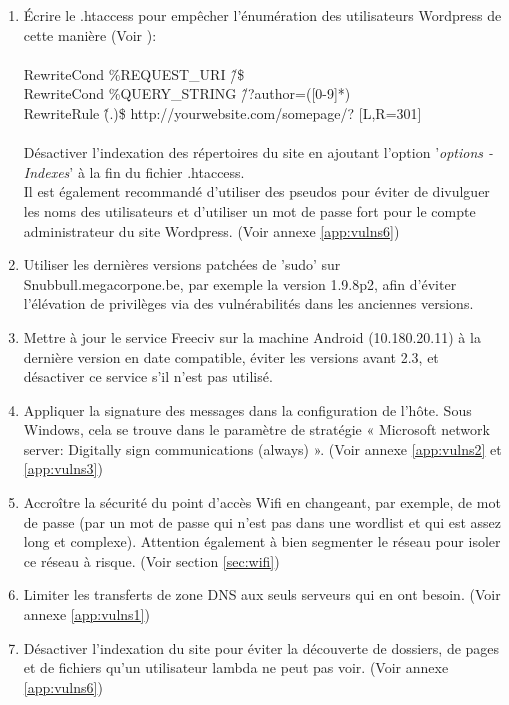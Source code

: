 \documentclass[a4paper]{article}
\begin{document}
\begin{enumerate}
    \item Écrire le .htaccess pour empêcher l'énumération des utilisateurs Wordpress de cette manière (Voir \cite{3}):\\ \\
    RewriteCond \%{REQUEST\_URI}  \^/\$\\
    RewriteCond \%{QUERY\_STRING} \^/?author=([0-9]*)\\
    RewriteRule \^(.\*)\$ http://yourwebsite.com/somepage/? [L,R=301]\\\\
    Désactiver l'indexation des répertoires du site en ajoutant l'option '\emph{options -Indexes}' à la fin du fichier .htaccess.\\
    Il est également recommandé d'utiliser des pseudos pour éviter de divulguer les noms des utilisateurs et d'utiliser un mot de passe fort pour le compte administrateur du site Wordpress. (Voir annexe \ref{app:vulns6})
    
    \item Utiliser les dernières versions patchées de 'sudo' sur Snubbull.megacorpone.be, par exemple la version 1.9.8p2, afin d'éviter l'élévation de privilèges via des vulnérabilités dans les anciennes versions. \cite{5}
    
    \item Mettre à jour le service Freeciv sur la machine Android (10.180.20.11) à la dernière version en date compatible, éviter les versions avant 2.3, et désactiver ce service s'il n'est pas utilisé.
    
    \item Appliquer la signature des messages dans la configuration de l'hôte. Sous Windows, cela se trouve dans le paramètre de stratégie « Microsoft network server: Digitally sign communications (always) ». (Voir annexe \ref{app:vulns2} et \ref{app:vulns3})
    
    \item Accroître la sécurité du point d'accès Wifi en changeant, par exemple, de mot de passe (par un mot de passe qui n'est pas dans une wordlist et qui est assez long et complexe). Attention également à bien segmenter le réseau pour isoler ce réseau à risque. (Voir section \ref{sec:wifi})
    
    \item Limiter les transferts de zone DNS aux seuls serveurs qui en ont besoin. (Voir annexe \ref{app:vulns1})
    
    \item Désactiver l'indexation du site pour éviter la découverte de dossiers, de pages et de fichiers qu'un utilisateur lambda ne peut pas voir. (Voir annexe \ref{app:vulns6})
    

\end{enumerate}
\end{document}
